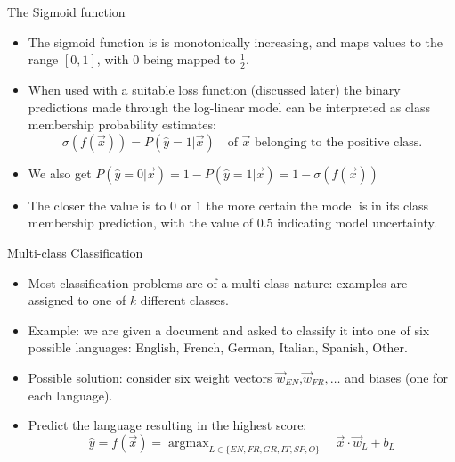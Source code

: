 \documentclass[handout]{beamer}
\begin{document}
\begin{frame}{The Sigmoid function}

\begin{scriptsize}
\begin{itemize}
\item The sigmoid function is is monotonically increasing, and maps values
to the range $[0, 1]$, with $0$ being mapped to $\frac{1}{2}$.
\item When used with a suitable loss function (discussed later) the binary predictions made through the log-linear model can be interpreted as class membership probability estimates:
\begin{equation}
 \sigma(f(\vec{x})) = P(\hat{y} = 1| \vec{x}) \quad \text{of $\vec{x}$ belonging to the positive class.}
\end{equation}
\item We also get $P(\hat{y} = 0| \vec{x}) = 1 - P(\hat{y} = 1| \vec{x}) = 1 -  \sigma(f(\vec{x}))$
\item The closer the value is to $0$ or $1$ the more certain the model is in its class membership prediction, with the value of $0.5$ indicating model uncertainty.
\end{itemize}
\end{scriptsize}
\end{frame}




\begin{frame}{Multi-class Classification}

\begin{scriptsize}
\begin{itemize}
\item Most classification problems are of a multi-class nature: examples are assigned to one of $k$ different classes.
\item Example: we are given a document and asked to classify it into one of six possible languages: English, French, German, Italian, Spanish, Other.
\item Possible solution: consider six weight vectors $\vec{w}_{EN}$,$\vec{w}_{FR},\dots$ and biases (one for each language).
\item Predict the language resulting in the highest score:
\begin{equation}
 \hat{y} = f(\vec{x}) = \operatorname{argmax}_{L \in \{ EN,FR,GR,IT,SP,O \}} \quad \vec{x}\cdot \vec{w}_L+ b_{L}
\end{equation}
\end{itemize}
\end{scriptsize}
\end{frame}
\end{document}
